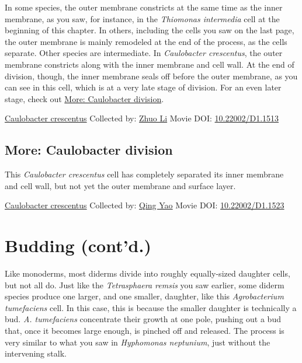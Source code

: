 \documentclass[]{tufte-book}
\begin{document}
In some species, the outer membrane constricts at the same time as the inner membrane, as you saw, for instance, in the \emph{Thiomonas intermedia} cell at the beginning of this chapter. In others, including the cells you saw on the last page, the outer membrane is mainly remodeled at the end of the process, as the cells separate. Other species are intermediate. In \emph{Caulobacter crescentus}, the outer membrane constricts along with the inner membrane and cell wall. At the end of division, though, the inner membrane seals off before the outer membrane, as you can see in this cell, which is at a very late stage of division. For an even later stage, check out \protect\hyperlink{Caulobacter_division}{More: Caulobacter division}.



\hypertarget{htmlwidget-3441174c86f55e8afa88}{}

\label{fig:5-7}\protect\hyperlink{tree}{Caulobacter crescentus} Collected by: \protect\hyperlink{zhuo_li}{Zhuo Li} Movie DOI: \href{https://doi.org/10.22002/D1.1513}{10.22002/D1.1513}

\hypertarget{Caulobacter_division}{%
\subsection*{More: Caulobacter division}\label{Caulobacter_division}}

This \emph{Caulobacter crescentus} cell has completely separated its inner membrane and cell wall, but not yet the outer membrane and surface layer.



\hypertarget{htmlwidget-7aad5060e2328710b8e5}{}

\label{fig:5-7a}\protect\hyperlink{tree}{Caulobacter crescentus} Collected by: \protect\hyperlink{qing_yao}{Qing Yao} Movie DOI: \href{https://doi.org/10.22002/D1.1523}{10.22002/D1.1523}

\hypertarget{budding-contd.}{%
\section{Budding (cont'd.)}\label{budding-contd.}}

Like monoderms, most diderms divide into roughly equally-sized daughter cells, but not all do. Just like the \emph{Tetrasphaera remsis} you saw earlier, some diderm species produce one larger, and one smaller, daughter, like this \emph{Agrobacterium tumefaciens} cell. In this case, this is because the smaller daughter is technically a bud. \emph{A. tumefaciens} concentrate their growth at one pole, pushing out a bud that, once it becomes large enough, is pinched off and released. The process is very similar to what you saw in \emph{Hyphomonas neptunium}, just without the intervening stalk.
\end{document}
